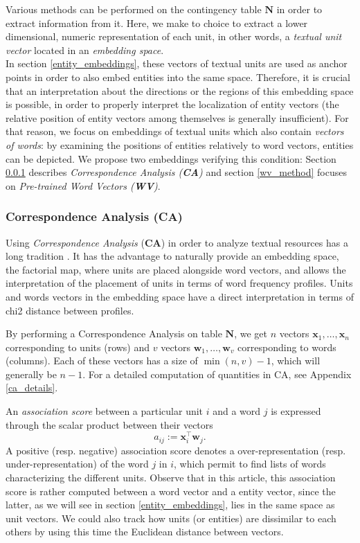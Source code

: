 \documentclass[
twocolumn,
]{ceurart}
\begin{document}
Various methods can be performed on the contingency table $\mathbf{N}$ in order to extract information from it. Here, we make to choice to extract a lower dimensional, numeric representation of each unit, in other words, a \emph{textual unit vector} located in an \emph{embedding space}. \\
In section \ref{entity_embeddings}, these vectors of textual units are used as anchor points in order to also embed entities into the same space. Therefore, it is crucial that an interpretation about the directions or the regions of this embedding space is possible, in order to properly interpret the localization of entity vectors (the relative position of entity vectors among themselves is generally insufficient). For that reason, we focus on embeddings of textual units which also contain \emph{vectors of words}: by examining the positions of entities relatively to word vectors, entities can be depicted. We propose two embeddings verifying this condition: Section \ref{ca_method} describes \emph{Correspondence Analysis (\textbf{CA})} and section \ref{wv_method} focuses on \emph{Pre-trained Word Vectors (\textbf{WV})}. 

\subsubsection{Correspondence Analysis (CA)}
\label{ca_method}

Using \emph{Correspondence Analysis} (\textbf{CA}) in order to analyze textual resources has a long tradition \cite{Lebart2019}. It has the advantage to naturally provide an embedding space, the factorial map, where units are placed alongside word vectors, and allows the interpretation of the placement of units in terms of word frequency profiles. Units and words vectors in the embedding space have a direct interpretation in terms of chi2 distance between profiles.

By performing a Correspondence Analysis on table $\mathbf{N}$, we get $n$ vectors $\mathbf{x}_1, \ldots, \mathbf{x}_n$ corresponding to units (rows) and $v$ vectors $\mathbf{w}_1, \ldots, \mathbf{w}_v$ corresponding to words (columns). Each of these vectors has a size of $\min(n, v) - 1$, which will generally be $n - 1$. For a detailed computation of quantities in CA, see Appendix \ref{ca_details}. 

An \emph{association score} between a particular unit $i$ and a word $j$ is expressed through the scalar product between their vectors 
\begin{equation}
a_{ij} := \mathbf{x}^\top_i \mathbf{w}_j.
\end{equation}
A positive (resp. negative) association score denotes a over-representation (resp. under-representation) of the word $j$ in $i$, which permit to find lists of words characterizing the different units. Observe that in this article, this association score is rather computed between a word vector and a entity vector, since the latter, as we will see in section \ref{entity_embeddings}, lies in the same space as unit vectors. We could also track how units (or entities) are dissimilar to each others by using this time the Euclidean distance between vectors.
\end{document}
